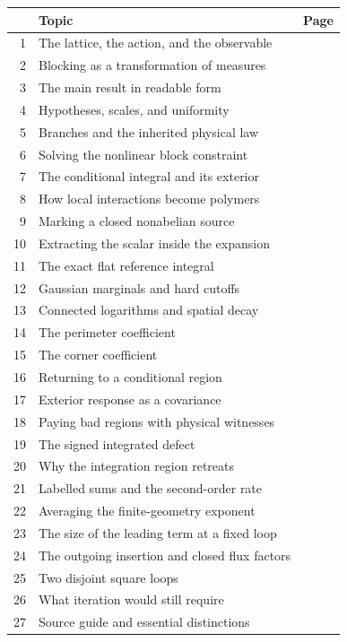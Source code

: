 \documentclass[11pt,a4paper]{article}
\begin{document}
\vspace{5pt}
\begin{tabularx}{\textwidth}{@{}rXr@{}}
    \toprule
    & \textbf{Topic} & \textbf{Page}\\
    \midrule
    1 & The lattice, the action, and the observable & \pageref{summary:1}\\
    2 & Blocking as a transformation of measures & \pageref{summary:2}\\
    3 & The main result in readable form & \pageref{summary:3}\\
    4 & Hypotheses, scales, and uniformity & \pageref{summary:4}\\
    5 & Branches and the inherited physical law & \pageref{summary:5}\\
    6 & Solving the nonlinear block constraint & \pageref{summary:6}\\
    7 & The conditional integral and its exterior & \pageref{summary:7}\\
    8 & How local interactions become polymers & \pageref{summary:8}\\
    9 & Marking a closed nonabelian source & \pageref{summary:9}\\
    10 & Extracting the scalar inside the expansion & \pageref{summary:10}\\
    11 & The exact flat reference integral & \pageref{summary:11}\\
    12 & Gaussian marginals and hard cutoffs & \pageref{summary:12}\\
    13 & Connected logarithms and spatial decay & \pageref{summary:13}\\
    14 & The perimeter coefficient & \pageref{summary:14}\\
    15 & The corner coefficient & \pageref{summary:15}\\
    16 & Returning to a conditional region & \pageref{summary:16}\\
    17 & Exterior response as a covariance & \pageref{summary:17}\\
    18 & Paying bad regions with physical witnesses & \pageref{summary:18}\\
    19 & The signed integrated defect & \pageref{summary:19}\\
    20 & Why the integration region retreats & \pageref{summary:20}\\
    21 & Labelled sums and the second-order rate & \pageref{summary:21}\\
    22 & Averaging the finite-geometry exponent & \pageref{summary:22}\\
    23 & The size of the leading term at a fixed loop & \pageref{summary:23}\\
    24 & The outgoing insertion and closed flux factors & \pageref{summary:24}\\
    25 & Two disjoint square loops & \pageref{summary:25}\\
    26 & What iteration would still require & \pageref{summary:26}\\
    27 & Source guide and essential distinctions & \pageref{summary:27}\\
    \bottomrule
\end{tabularx}
\end{document}
